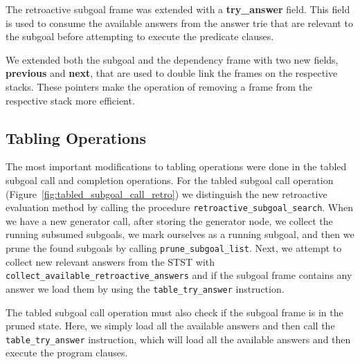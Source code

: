 The retroactive subgoal frame was extended with a \textbf{try\_answer} field. This field is used
to consume the available answers from the answer trie that are relevant to the subgoal
before attempting to execute the predicate clauses.

We extended both the subgoal and the dependency frame with two new fields, \textbf{previous} and
\textbf{next}, that are used to double link the frames on the respective stacks. These pointers
make the operation of removing a frame from the respective stack more efficient.

\subsection{Tabling Operations}

The most important modifications to tabling operations were done in the tabled subgoal call and
completion operations. For the tabled subgoal call operation (Figure~\ref{fig:tabled_subgoal_call_retro})
we distinguish the new retroactive evaluation method by calling the procedure \texttt{retroactive\_subgoal\_search}.
When we have a new generator call, after storing the
generator node, we collect the running subsumed subgoals, we mark ourselves as a running subgoal, and
then we prune the found subgoals by calling \texttt{prune\_subgoal\_list}.
Next, we attempt to collect new relevant answers from the STST with
\texttt{collect\_available\_retroactive\_answers} and if the subgoal frame contains any answer
we load them by using the \texttt{table\_try\_answer} instruction.

The tabled subgoal call operation must also check if the subgoal frame is in the pruned state. Here,
we simply load all the available answers and then call the \texttt{table\_try\_answer} instruction,
which will load all the available answers and then execute the program clauses.

